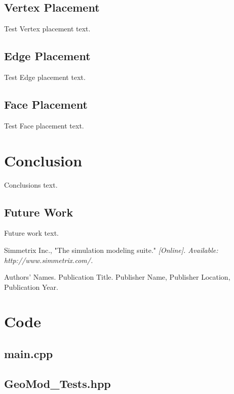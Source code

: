 \documentclass[a4paper, 12pt]{article}
\begin{document}
\subsection{Vertex Placement} \label{subsec:vertexTest}
Test Vertex placement text.

\subsection{Edge Placement} \label{subsec:edgeTest}
Test Edge placement text.

\subsection{Face Placement} \label{subsec:faceTest}
Test Face placement text.

\section{Conclusion} \label{sec:conclusion}
Conclusions text. 

\subsection{Future Work} \label{subsec:future}
Future work text.

\newpage
\begin{thebibliography}{99}

Simmetrix Inc., 
"The simulation modeling suite."
\textit{[Online]. Available: http://www.simmetrix.com/.}


Authors' Names. 
Publication Title.
Publisher Name, Publisher Location, Publication Year.

\end{thebibliography}

\newpage
\appendix
\section{Code} \label{sec:code}

\subsection{main.cpp} \label{subsec:main_cpp}


\subsection{GeoMod\_Tests.hpp} \label{subsec:Tests_hpp}

\end{document}
